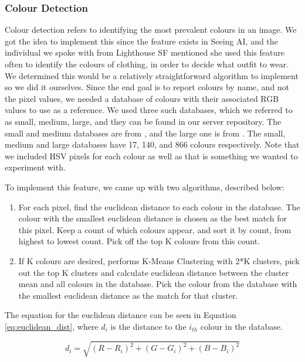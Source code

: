 \documentclass[a4paper,11pt]{article}
\begin{document}
\subsubsection{Colour Detection}
\label{colour-detection}
Colour detection refers to identifying the most prevalent colours in an image. We got the idea to implement this since the feature exists in Seeing AI, and the individual we spoke with from Lighthouse SF mentioned she used this feature often to identify the colours of clothing, in order to decide what outfit to wear. We determined this would be a relatively straightforward algorithm to implement so we did it ourselves. Since the end goal is to report colours by name, and not the pixel values, we needed a database of colours with their associated RGB values to use as a reference. We used three such databases, which we referred to as small, medium, large, and they can be found
\href{https://github.com/vizia-fydp/server/tree/main/color_detection}{\color{blue}{here}}
 in our server repository. The small and medium databases are from \cite{color-small-medium}, and the large one is from \cite{color-large}. The small, medium and large databases have 17, 140, and 866 colours respectively. Note that we included HSV pixels for each colour as well as that is something we wanted to experiment with.

To implement this feature, we came up with two algorithms, described below:

\newpage
\begin{enumerate}
    \item For each pixel, find the euclidean distance to each colour in the database. The colour with the smallest euclidean distance is chosen as the best match for this pixel. Keep a count of which colours appear, and sort it by count, from highest to lowest count. Pick off the top K colours from this count.
    \item If K colours are desired, performs K-Means Clustering \cite{k-means-wikipedia, k-means-opencv} with 2*K clusters, pick out the top K clusters and calculate euclidean distance between the cluster mean and all colours in the database. Pick the colour from the database with the smallest euclidean distance as the match for that cluster.
\end{enumerate}

The equation for the euclidean distance can be seen in Equation \ref{eq:euclidean_dist}, where $d_i$ is the distance to the $i_{th}$ colour in the database. 

\begin{equation}
\label{eq:euclidean_dist}
d_i=\sqrt{(R - R_i)^2 + (G - G_i)^2 + (B - B_i)^2}
\end{equation}
\end{document}
